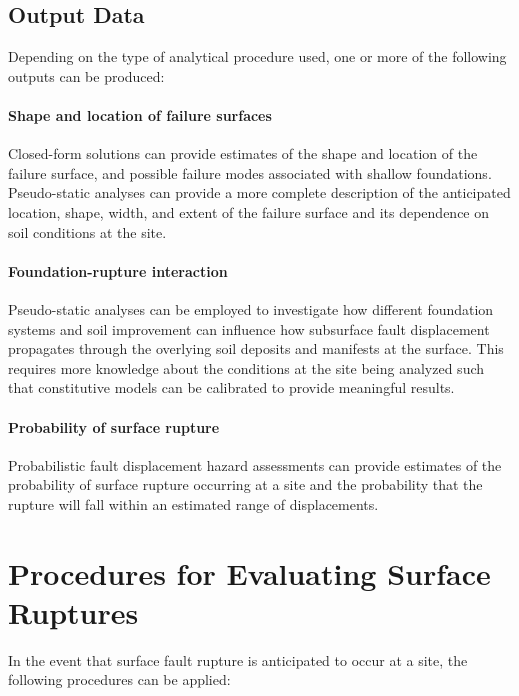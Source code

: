 \subsection{Output Data}
Depending on the type of analytical procedure used, one or more of the following outputs can be produced:

\paragraph{Shape and location of failure surfaces}
Closed-form solutions can provide estimates of the shape and location of the failure surface, and possible failure modes associated with shallow foundations. Pseudo-static analyses can provide a more complete description of the anticipated location, shape, width, and extent of the failure surface and its dependence on soil conditions at the site. %

\paragraph{Foundation-rupture interaction}
Pseudo-static analyses can be employed to investigate how different foundation systems and soil improvement can influence how subsurface fault displacement propagates through the overlying soil deposits and manifests at the surface. This requires more knowledge about the conditions at the site being analyzed such that constitutive models can be calibrated to provide meaningful results.

\paragraph{Probability of surface rupture}
Probabilistic fault displacement hazard assessments can provide estimates of the probability of surface rupture occurring at a site and the probability that the rupture will fall within an estimated range of displacements.

\section{Procedures for Evaluating Surface Ruptures}
\label{sec:eq_surface_rup_procedures}

In the event that surface fault rupture is anticipated to occur at a site, the following procedures can be applied:

